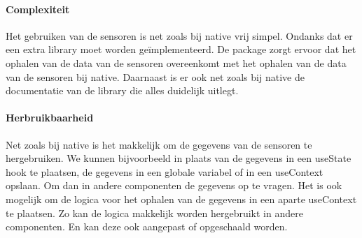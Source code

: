 \paragraph{Complexiteit}
Het gebruiken van de sensoren is net zoals bij native vrij simpel. Ondanks dat er een extra library moet worden
geïmplementeerd. De package zorgt ervoor dat het ophalen van de data van de sensoren overeenkomt met het 
ophalen van de data van de sensoren bij native. Daarnaast is er ook net zoals bij native de documentatie van
de library die alles duidelijk uitlegt.

\paragraph{Herbruikbaarheid}
Net zoals bij native is het makkelijk om de gegevens van de sensoren te hergebruiken. We kunnen bijvoorbeeld in plaats van de
gegevens in een useState hook te plaatsen, de gegevens in een globale variabel of in een useContext opslaan. 
Om dan in andere componenten de gegevens op te vragen. Het is ook mogelijk om de logica voor het ophalen van de gegevens
in een aparte useContext te plaatsen. Zo kan de logica makkelijk worden hergebruikt in andere componenten.
En kan deze ook aangepast of opgeschaald worden. 
